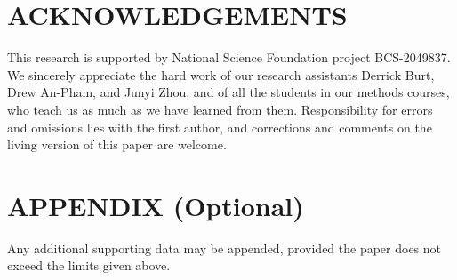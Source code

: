 \documentclass{isprs} %
\begin{document}
\section*{ACKNOWLEDGEMENTS}\label{ACKNOWLEDGEMENTS}
This research is supported by National Science Foundation project BCS-2049837.
We sincerely appreciate the hard work of our research assistants Derrick Burt, Drew An-Pham, and Junyi Zhou, and of all the students in our methods courses, who teach us as much as we have learned from them. 
Responsibility for errors and omissions lies with the first author, and corrections and comments on the living version \citep{foss4g2022} of this paper are welcome.

{
	\begin{spacing}{1.17}
		\normalsize
	\end{spacing}
}

\section*{APPENDIX (Optional)}\label{APPENDIX}

Any additional supporting data may be appended, provided the paper does not exceed the limits given above. 
\end{document}
